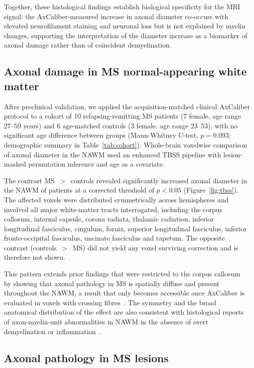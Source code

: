 \documentclass[11pt]{article}
\begin{document}
Together, these histological findings establish biological specificity for the MRI signal: the AxCaliber-measured increase in axonal diameter co-occurs with elevated neurofilament staining and neuronal loss but is not explained by myelin changes, supporting the interpretation of the diameter increase as a biomarker of axonal damage rather than of coincident demyelination.

\subsection{Axonal damage in MS normal-appearing white matter}

After preclinical validation, we applied the acquisition-matched clinical AxCaliber protocol to a cohort of 10 relapsing-remitting MS patients (7 female, age range 27--59 years) and 6 age-matched controls (3 female, age range 23--53), with no significant age difference between groups (Mann-Whitney $U$-test, $p=0.093$; demographic summary in Table~\ref{tab:cohort}). Whole-brain voxelwise comparison of axonal diameter in the NAWM used an enhanced TBSS pipeline with lesion-masked permutation inference and age as a covariate.

The contrast MS~$>$~controls revealed significantly increased axonal diameter in the NAWM of patients at a corrected threshold of $p<0.05$ (Figure~\ref{fig:tbss}). The affected voxels were distributed symmetrically across hemispheres and involved all major white-matter tracts interrogated, including the corpus callosum, internal capsule, corona radiata, thalamic radiation, inferior longitudinal fasciculus, cingulum, fornix, superior longitudinal fasciculus, inferior fronto-occipital fasciculus, uncinate fasciculus and tapetum. The opposite contrast (controls~$>$~MS) did not yield any voxel surviving correction and is therefore not shown.

This pattern extends prior findings that were restricted to the corpus callosum~\cite{desantis2019whole} by showing that axonal pathology in MS is spatially diffuse and present throughout the NAWM, a result that only becomes accessible once AxCaliber is evaluated in voxels with crossing fibres~\cite{jeurissen2013investigating}. The symmetry and the broad anatomical distribution of the effect are also consistent with histological reports of axon-myelin-unit abnormalities in NAWM in the absence of overt demyelination or inflammation~\cite{luchicchi2021axonal}.

\subsection{Axonal pathology in MS lesions}
\end{document}
